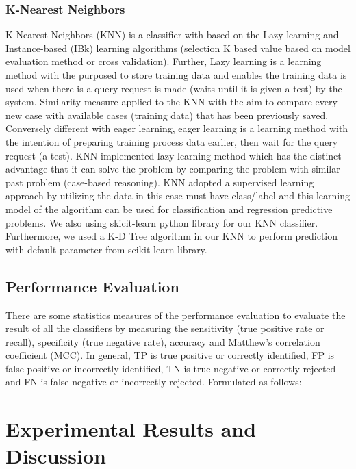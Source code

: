 \documentclass[10pt,twocolumn]{article}
\begin{document}
\subsubsection{K-Nearest Neighbors}
K-Nearest Neighbors (KNN) is a classifier with based on the Lazy learning and Instance-based (IBk) learning algorithms (selection K based value based on model evaluation method or cross validation). Further, Lazy learning is a learning method with the purposed to store training data and enables the training data is used when there is a query request is made (waits until it is given a test) by the system. Similarity measure applied to the KNN with the aim to compare every new case with available cases (training data) that has been previously saved. Conversely different with eager learning, eager learning is a learning method with the intention of preparing training process data earlier, then wait for the query request (a test). KNN implemented lazy learning method which has the distinct advantage that it can solve the problem by comparing the problem with similar past problem (case-based reasoning). KNN adopted a supervised learning approach by utilizing the data in this case must have class/label and this learning model of the algorithm can be used for classification and regression predictive problems.
We also using skicit-learn python library for our KNN classifier. Furthermore, we used a K-D Tree algorithm in our KNN to perform prediction with default parameter from scikit-learn library.
\subsection{Performance Evaluation}
There are some statistics measures of the performance evaluation to evaluate the result of all the classifiers by measuring the sensitivity (true positive rate or recall), specificity (true negative rate), accuracy and Matthew's correlation coefficient (MCC). In general, TP is true positive or correctly identified, FP is false positive or incorrectly identified, TN is true negative or correctly rejected and FN is false negative or incorrectly rejected. Formulated as follows:

\section{Experimental Results and Discussion}
\end{document}
